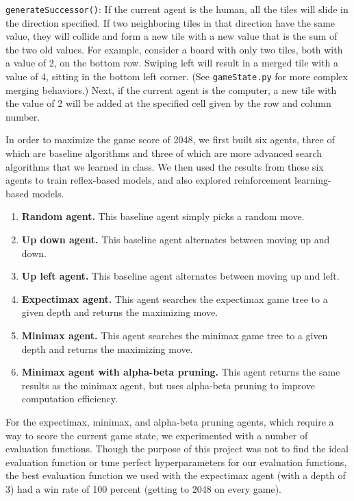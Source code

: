 \documentclass[9pt,twocolumn]{article}
\begin{document}
\texttt{generateSuccessor()}: If the current agent is the human, all the tiles will slide in the direction specified. If two neighboring tiles in that direction have the same value, they will collide and form a new tile with a new value that is the sum of the two old values. For example, consider a board with only two tiles, both with a value of 2, on the bottom row. Swiping left will result in a merged tile with a value of 4, sitting in the bottom left corner. (See \texttt{gameState.py} for more complex merging behaviors.) Next, if the current agent is the computer, a new tile with the value of 2 will be added at the specified cell given by the row and column number.

In order to maximize the game score of 2048, we first built six agents, three of which are baseline algorithms and three of which are more advanced search algorithms that we learned in class. We then used the results from these six agents to train reflex-based models, and also explored reinforcement learning-based models.

\begin{enumerate}[1)]

\item \textbf{Random agent.} This baseline agent simply picks a random move.

\item \textbf{Up down agent.} This baseline agent alternates between moving up and down.

\item \textbf{Up left agent.} This baseline agent alternates between moving up and left.

\item \textbf{Expectimax agent.} This agent searches the expectimax game tree to a given depth and returns the maximizing move.

\item \textbf{Minimax agent.} This agent searches the minimax game tree to a given depth and returns the maximizing move.

\item \textbf{Minimax agent with alpha-beta pruning.} This agent returns the same results as the minimax agent, but uses alpha-beta pruning to improve computation efficiency.

\end{enumerate}

For the expectimax, minimax, and alpha-beta pruning agents, which require a way to score the current game state, we experimented with a number of evaluation functions. Though the purpose of this project was not to find the ideal evaluation function or tune perfect hyperparameters for our evaluation functions, the best evaluation function we used with the expectimax agent (with a depth of 3) had a win rate of 100 percent (getting to 2048 on every game).
\end{document}
